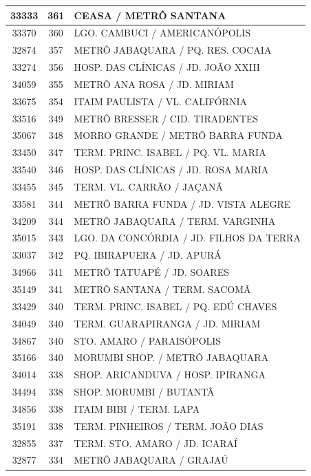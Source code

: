 \documentclass[
	12pt,				%
	oneside,			%
	a4paper,			%
	english,			%
	brazil				%
	]{abntex2ppgsi}
\begin{document}
{{{\begin{apendicesenv}
\begin{longtable}{c|c|p{7cm}}
 \hline 
33333 &	361 &	CEASA / METRÔ SANTANA \\ 
 \hline 
33370 &	360 &	LGO. CAMBUCI / AMERICANÓPOLIS \\ 
 \hline 
32874 &	357 &	METRÔ JABAQUARA / PQ. RES. COCAIA \\ 
 \hline 
33274 &	356 &	HOSP. DAS CLÍNICAS / JD. JOÃO XXIII \\ 
 \hline 
34059 &	355 &	METRÔ ANA ROSA / JD. MIRIAM \\ 
 \hline 
33675 &	354 &	ITAIM PAULISTA / VL. CALIFÓRNIA \\ 
 \hline 
33516 &	349 &	METRÔ BRESSER / CID. TIRADENTES \\ 
 \hline 
35067 &	348 &	MORRO GRANDE / METRÔ BARRA FUNDA \\ 
 \hline 
33450 &	347 &	TERM. PRINC. ISABEL / PQ. VL. MARIA \\ 
 \hline 
33540 &	346 &	HOSP. DAS CLÍNICAS / JD. ROSA MARIA \\ 
 \hline 
33455 &	345 &	TERM. VL. CARRÃO / JAÇANÃ \\ 
 \hline 
33581 &	344 &	METRÔ BARRA FUNDA / JD. VISTA ALEGRE \\ 
 \hline 
34209 &	344 &	METRÔ JABAQUARA / TERM. VARGINHA \\ 
 \hline 
35015 &	343 &	LGO. DA CONCÓRDIA / JD. FILHOS DA TERRA \\ 
 \hline 
33037 &	342 &	PQ. IBIRAPUERA / JD. APURÁ \\ 
 \hline 
34966 &	341 &	METRÔ TATUAPÉ / JD. SOARES \\ 
 \hline 
35149 &	341 &	METRÔ SANTANA / TERM. SACOMÃ \\ 
 \hline 
33429 &	340 &	TERM. PRINC. ISABEL / PQ. EDÚ CHAVES \\ 
 \hline 
34049 &	340 &	TERM. GUARAPIRANGA / JD. MIRIAM \\ 
 \hline 
34867 &	340 &	STO. AMARO / PARAISÓPOLIS \\ 
 \hline 
35166 &	340 &	MORUMBI SHOP. / METRÔ JABAQUARA \\ 
 \hline 
34014 &	338 &	SHOP. ARICANDUVA / HOSP. IPIRANGA \\ 
 \hline 
34494 &	338 &	SHOP. MORUMBI / BUTANTÃ \\ 
 \hline 
34856 &	338 &	ITAIM BIBI / TERM. LAPA \\ 
 \hline 
35191 &	338 &	TERM. PINHEIROS / TERM. JOÃO DIAS \\ 
 \hline 
32855 &	337 &	TERM. STO. AMARO / JD. ICARAÍ \\ 
 \hline 
32877 &	334 &	METRÔ JABAQUARA / GRAJAÚ \\ 

\end{longtable}
\end{apendicesenv}}}}
\end{document}
